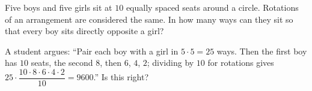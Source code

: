 Five boys and five girls sit at $10$ equally spaced seats around a circle. Rotations of an arrangement are considered the same. In how many ways can they sit so that every boy sits directly opposite a girl?

A student argues: ``Pair each boy with a girl in $5\cdot5=25$ ways. Then the first boy has $10$ seats, the second $8$, then $6$, $4$, $2$; dividing by $10$ for rotations gives $25\cdot\dfrac{10\cdot8\cdot6\cdot4\cdot2}{10}=9600$.'' Is this right?
